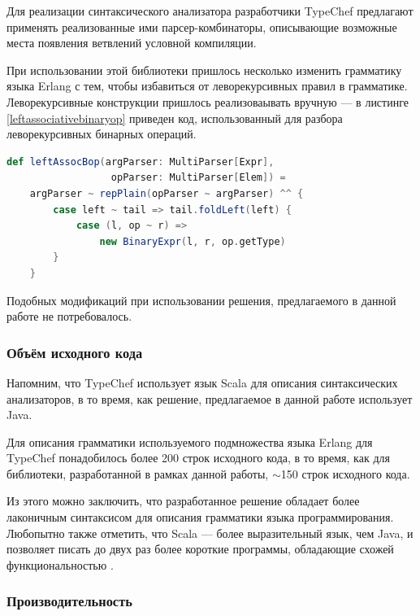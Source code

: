 Для реализации синтаксического анализатора разработчики TypeChef предлагают применять реализованные ими парсер-комбинаторы, описывающие возможные места появления ветвлений условной компиляции. 

При использовании этой библиотеки пришлось несколько изменить грамматику языка Erlang с тем, чтобы избавиться от леворекурсивных правил в грамматике. Леворекурсивные конструкции пришлось реализоваывать вручную --- в листинге \ref{leftassociativebinaryop} приведен код, использованный для разбора леворекурсивных бинарных операций. 

\begin{minipage}{\linewidth}
\begin{lstlisting}[caption={Реализация леворекурсивных конструкций в TypeChef},label=leftassociativebinaryop,language=Scala]
def leftAssocBop(argParser: MultiParser[Expr], 
                  opParser: MultiParser[Elem]) =
	argParser ~ repPlain(opParser ~ argParser) ^^ {
		case left ~ tail => tail.foldLeft(left) {
			case (l, op ~ r) => 
				new BinaryExpr(l, r, op.getType)
		}
	}
\end{lstlisting}
\end{minipage}

Подобных модификаций при использовании решения, предлагаемого в данной работе не потребовалось.

\subsubsection{Объём исходного кода}

Напомним, что TypeChef использует язык Scala для описания синтаксических анализаторов, в то время, как решение, предлагаемое в данной работе использует Java.

Для описания грамматики используемого подмножества языка Erlang для TypeChef понадобилось более 200 строк исходного кода, в то время, как для библиотеки, разработанной в рамках данной работы, $\sim$150 строк исходного кода.

Из этого можно заключить, что разработанное решение обладает более лаконичным синтаксисом для описания грамматики языка программирования. Любопытно также отметить, что Scala --- более выразительный язык, чем Java, и позволяет писать до двух раз более короткие программы, обладающие схожей функциональностью \cite{scalavsjava}.


\subsubsection{Производительность}

